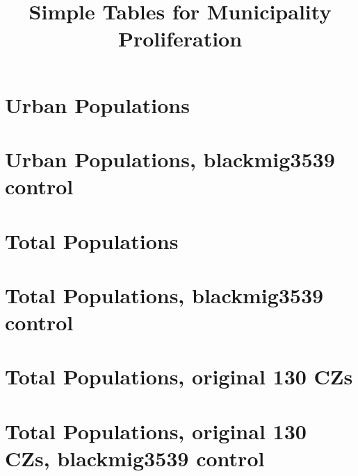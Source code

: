 \documentclass{article}
\title{Simple Tables for Municipality Proliferation}
\begin{document}
\maketitle
\tableofcontents
{\footnotesize 
\listoffigures
\listoftables}
\clearpage

\section{Urban Populations}

\clearpage
\section{Urban Populations, blackmig3539 control}

\clearpage
\section{Total Populations}

\clearpage
\section{Total Populations, blackmig3539 control}

\clearpage
\section{Total Populations, original 130 CZs}

\clearpage
\section{Total Populations, original 130 CZs, blackmig3539 control}

\clearpage
\end{document}
